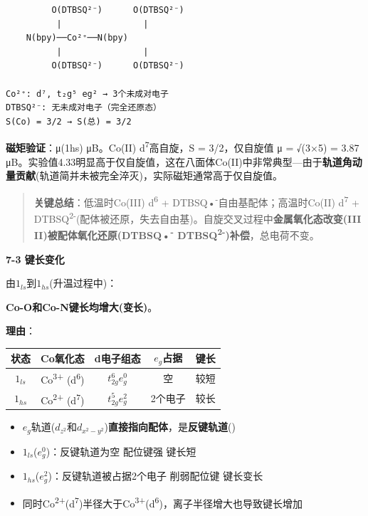 \begin{verbatim}
         O(DTBSQ²⁻)      O(DTBSQ²⁻)
          |                |
    N(bpy)──Co²⁺──N(bpy)
          |                |
         O(DTBSQ²⁻)      O(DTBSQ²⁻)

Co²⁺: d⁷, t₂g⁵ eg² → 3个未成对电子
DTBSQ²⁻: 无未成对电子（完全还原态）
S(Co) = 3/2 → S(总) = 3/2
\end{verbatim}

\textbf{磁矩验证}：μ(1hs)  μB。Co(II) d\textsuperscript{7}高自旋，S = 3/2，仅自旋值 μ = √(3×5) = 3.87 μB。实验值4.33明显高于仅自旋值，这在八面体Co(II)中非常典型---由于\textbf{轨道角动量贡献}(轨道简并未被完全淬灭)，实际磁矩通常高于仅自旋值。

\begin{quote}
\textbf{关键总结}：低温时Co(III) d\textsuperscript{6} + DTBSQ•\textsuperscript{-}自由基配体；高温时Co(II) d\textsuperscript{7} + DTBSQ\textsuperscript{2-}(配体被还原，失去自由基)。自旋交叉过程中\textbf{金属氧化态改变(III \箭 II)被配体氧化还原(DTBSQ•\textsuperscript{-} \箭 DTBSQ\textsuperscript{2-})补偿}，总电荷不变。
\end{quote}

\textbf{7-3 键长变化}

由\(1_{ls}\)到\(1_{hs}\)(升温过程中)：

\textbf{Co-O和Co-N键长均增大(变长)}。

\textbf{理由}：

{\def\LTcaptype{none} %
\begin{longtable}[]{@{}ccccc@{}}
\toprule\noalign{}
状态 & Co氧化态 & d电子组态 & \(e_g\)占据 & 键长 \\
\midrule\noalign{}
\endhead
\bottomrule\noalign{}
\endlastfoot
\(1_{ls}\) & Co\textsuperscript{3+} (d\textsuperscript{6}) & \(t_{2g}^{6}e_{g}^{0}\) & 空 & 较短 \\
\(1_{hs}\) & Co\textsuperscript{2+} (d\textsuperscript{7}) & \(t_{2g}^{5}e_{g}^{2}\) & 2个电子 & 较长 \\
\end{longtable}
}

\begin{itemize}
\tightlist
\item
  \(e_g\)轨道(\(d_{z^2}\)和\(d_{x^2-y^2}\))\textbf{直接指向配体}，是\textbf{反键轨道}()
\item
  \(1_{ls}\)(\(e_{g}^{0}\))：反键轨道为空 \箭 配位键强 \箭 键长短
\item
  \(1_{hs}\)(\(e_{g}^{2}\))：反键轨道被占据2个电子 \箭 削弱配位键 \箭 键长变长
\item
  同时Co\textsuperscript{2+}(d\textsuperscript{7})半径大于Co\textsuperscript{3+}(d\textsuperscript{6})，离子半径增大也导致键长增加
\end{itemize}


